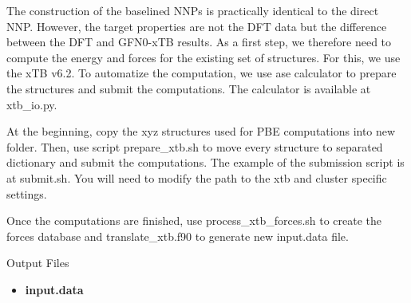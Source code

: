 \documentclass[12pt]{article}
\begin{document}
The construction of the baselined NNPs is practically identical to the direct NNP. However, the target properties are not the DFT data but the difference between the DFT and GFN0-xTB results. As a first step, we therefore need to compute the energy and forces for the existing set of structures. For this, we use the xTB v6.2. To automatize the computation, we use ase calculator to prepare the structures and submit the computations. The calculator is available at xtb\_io.py. 

At the beginning, copy the xyz structures used for PBE computations into new folder. Then, use script prepare\_xtb.sh to move every structure to separated dictionary and submit the computations. The example of the submission script is at submit.sh. You will need to modify the path to the xtb and cluster specific settings.

Once the computations are finished, use process\_xtb\_forces.sh to create the forces database and translate\_xtb.f90 to generate new input.data file.

\begin{mybox3}{Output Files}
\begin{itemize}
    \item \textbf{input.data}
\end{itemize}
\end{mybox3}
%
\end{document}
